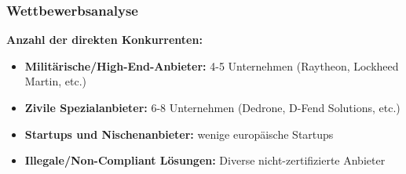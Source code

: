 \documentclass[11pt,a4paper]{article}
\begin{document}
\subsubsection*{Wettbewerbsanalyse}

\textbf{Anzahl der direkten Konkurrenten:}
\begin{itemize}
\item \textbf{Militärische/High-End-Anbieter:} 4-5 Unternehmen (Raytheon, Lockheed Martin, etc.)
\item \textbf{Zivile Spezialanbieter:} 6-8 Unternehmen (Dedrone, D-Fend Solutions, etc.)
\item \textbf{Startups und Nischenanbieter:} wenige europäische Startups
\item \textbf{Illegale/Non-Compliant Lösungen:} Diverse nicht-zertifizierte Anbieter
\end{itemize}
\end{document}
